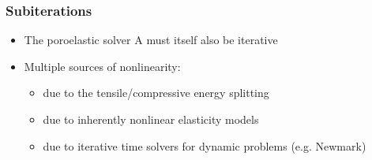 \documentclass{beamer}
\begin{document}
\begin{frame}
  \frametitle{Subiterations}

  \begin{itemize}
  \item The poroelastic solver A must itself also be iterative
  \item<2-> Multiple sources of nonlinearity:
    \begin{itemize}
    \item due to the tensile/compressive energy splitting
    \item due to inherently nonlinear elasticity models
    \item due to iterative time solvers for dynamic problems (e.g. Newmark)
    \end{itemize}
  \end{itemize}

\end{frame}
\end{document}
